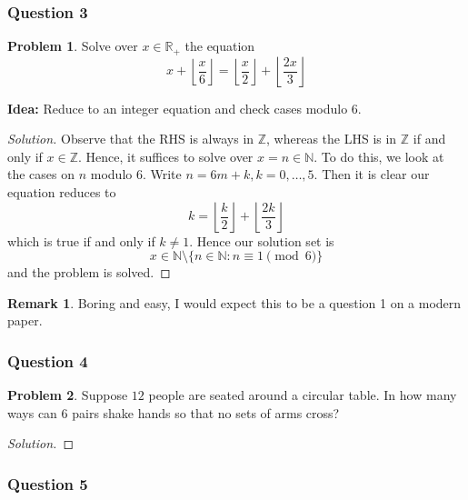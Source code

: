 \documentclass[11pt]{article}
\theoremstyle{definition}
\newtheorem*{problem}{Problem}
\newtheorem*{remark}{Remark}
\begin{document}
\newpage

\subsubsection{Question 3}

\begin{problem}
  Solve over $x \in \mathbb{R}_+$ the equation 
  \[x + \left\lfloor \frac{x}{6} \right\rfloor = \left\lfloor \frac{x}{2} \right\rfloor + \left\lfloor \frac{2x}{3}\right\rfloor\]
\end{problem}

{\bf Idea:} Reduce to an integer equation and check cases modulo $6$.

\begin{proof}[Solution]
  Observe that the RHS is always in $\mathbb{Z}$, whereas the LHS is in $\mathbb{Z}$ if and only if $x \in \mathbb{Z}$. 
  Hence, it suffices to solve over $x = n \in \mathbb{N}$. To do this, we look at the cases on $n$ modulo $6$. Write 
  $n = 6m + k, k = 0,\dots,5$. Then it is clear our equation reduces to 
  \[k = \left\lfloor \frac{k}{2} \right\rfloor + \left\lfloor \frac{2k}{3} \right\rfloor\]
  which is true if and only if $k \neq 1$. Hence our solution set is 
  \[x \in \mathbb{N} \setminus \{n \in \mathbb{N} : n \equiv 1 \! \! \! \pmod 6\}\]
  and the problem is solved. 
\end{proof}

\begin{remark}
  Boring and easy, I would expect this to be a question 1 on a modern paper.
\end{remark}

\newpage

\subsubsection{Question 4}

\begin{problem}
  Suppose $12$ people are seated around a circular table. In how many ways can $6$ pairs shake hands so that 
  no sets of arms cross?
\end{problem}

\begin{proof}[Solution]

\end{proof}

\newpage

\subsubsection{Question 5}
\end{document}
